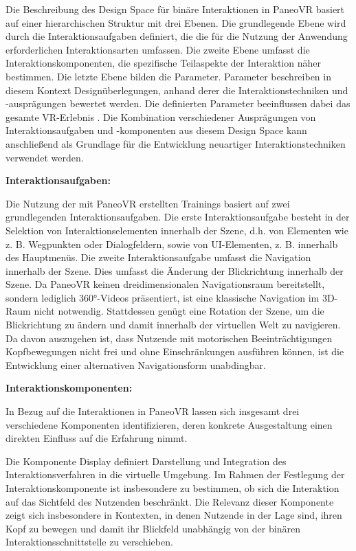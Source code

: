 Die Beschreibung des Design Space für binäre Interaktionen in PaneoVR basiert auf einer hierarchischen Struktur mit drei Ebenen. Die grundlegende Ebene wird durch die Interaktionsaufgaben definiert, die die für die Nutzung der Anwendung erforderlichen Interaktionsarten umfassen. Die zweite Ebene umfasst die Interaktionskomponenten, die spezifische Teilaspekte der Interaktion näher bestimmen. Die letzte Ebene bilden die Parameter. Parameter beschreiben in diesem Kontext Designüberlegungen, anhand derer die Interaktionstechniken und -ausprägungen bewertet werden. Die definierten Parameter beeinflussen dabei das gesamte VR-Erlebnis \citep{10.1145/3441852.3471230}. Die Kombination verschiedener Ausprägungen von Interaktionsaufgaben und -komponenten aus diesem Design Space kann anschließend als Grundlage für die Entwicklung neuartiger Interaktionstechniken verwendet werden.

{\normalfont \bfseries Interaktionsaufgaben:}  

Die Nutzung der mit PaneoVR erstellten Trainings basiert auf zwei grundlegenden Interaktionsaufgaben. Die erste Interaktionsaufgabe besteht in der Selektion von Interaktionselementen innerhalb der Szene, d.h. von Elementen wie z. B.  Wegpunkten oder Dialogfeldern, sowie von UI-Elementen, z. B. innerhalb des Hauptmenüs. Die zweite Interaktionsaufgabe umfasst die Navigation innerhalb der Szene. Dies umfasst die Änderung der Blickrichtung innerhalb der Szene. Da PaneoVR keinen dreidimensionalen Navigationsraum bereitstellt, sondern lediglich 360°-Videos präsentiert, ist eine klassische Navigation im 3D-Raum nicht notwendig. Stattdessen genügt eine Rotation der Szene, um die Blickrichtung zu ändern und damit innerhalb der virtuellen Welt zu navigieren. Da davon auszugehen ist, dass Nutzende mit motorischen Beeinträchtigungen Kopfbewegungen nicht frei und ohne Einschränkungen ausführen können, ist die Entwicklung einer alternativen Navigationsform unabdingbar. 

{\normalfont \bfseries Interaktionskomponenten:} 

In Bezug auf die Interaktionen in PaneoVR lassen sich insgesamt drei verschiedene Komponenten identifizieren, deren konkrete Ausgestaltung einen direkten Einfluss auf die Erfahrung nimmt. 

Die Komponente Display definiert Darstellung und Integration des Interaktionsverfahren in die virtuelle Umgebung. Im Rahmen der Festlegung der Interaktionskomponente ist insbesondere zu bestimmen, ob sich die Interaktion auf das Sichtfeld des Nutzenden beschränkt. Die Relevanz dieser Komponente zeigt sich insbesondere in Kontexten, in denen Nutzende in der Lage sind, ihren Kopf zu bewegen und damit ihr Blickfeld unabhängig von der binären Interaktionsschnittstelle zu verschieben.

